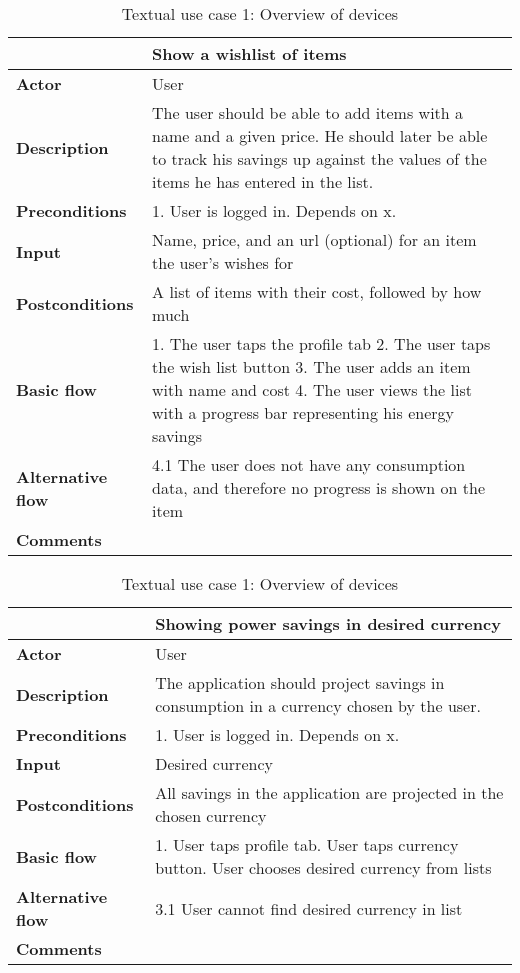 \begin{table}[H]
\begin{tabular}{|l|p{12cm}|}
\hline
&\textbf{Show a wishlist of items }
\\\hline
\textbf{Actor} &User
\\\hline
\textbf{Description}&
The user should be able to add items with a name and a given price. He should later be able to track his savings up against the values of the items he has entered in the list.\\\hline
\textbf{Preconditions}&
1. User is logged in.\newline
Depends on x.\\\hline
\textbf{Input}&
Name, price, and an url (optional) for an item the user's wishes for
\\\hline
\textbf{Postconditions}& 
A list of items with their cost, followed by how much %
\\\hline
\textbf{Basic flow}&
1. The user taps the profile tab
2. The user taps the wish list button
3. The user adds an item with name and cost
4. The user views the list with a progress bar representing his energy savings\newline
\\\hline
\textbf{Alternative flow}&
4.1 The user does not have any consumption data, and therefore no progress is shown on the item
\\\hline
\textbf{Comments}& \\\hline
\end{tabular}
\caption{Textual use case 1: Overview of devices}
\end{table}


\begin{table}[H]
\begin{tabular}{|l|p{12cm}|}
\hline
&\textbf{Showing power savings in desired currency}
\\\hline
\textbf{Actor} &User
\\\hline
\textbf{Description}&
The application should project savings in consumption in a currency chosen by the user.\\\hline
\textbf{Preconditions}&
1. User is logged in.\newline
Depends on x.\\\hline
\textbf{Input}&
Desired currency\\\hline
\textbf{Postconditions}& 
All savings in the application are projected in the chosen currency\\\hline
\textbf{Basic flow}&
1. User taps profile tab\newline
2. User taps currency button\newline
3. User chooses desired currency from lists
\\\hline
\textbf{Alternative flow}&
3.1 User cannot find desired currency in list
\\\hline
\textbf{Comments}& \\\hline
\end{tabular}
\caption{Textual use case 1: Overview of devices}
\end{table}



